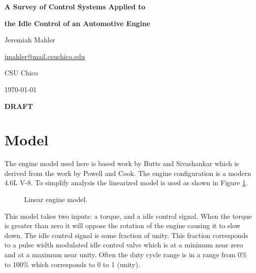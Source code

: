 \documentclass{article}
\begin{document}

\thispagestyle{empty}

\centerline{\Large \textbf{A Survey of Control Systems Applied to}}
\centerline{\Large \textbf{the Idle Control of an Automotive Engine}}
\vspace{0.1in}
\centerline{\normalsize {Jeremiah Mahler}}
\centerline{\small {\href{mailto:jmahler@mail.csuchico.edu}{jmahler@mail.csuchico.edu}} }
\vspace{0.1in}
\centerline{\normalsize {CSU Chico}}
\centerline{\small \today}
\vspace{0.2in}
\centerline{\LARGE \textbf{DRAFT}}
\vspace{0.2in}






\section{Model}

The engine model used here is based work
by Butts and Sivashankar\autocite{532315} which is derived from
the work by Powell and Cook\autocite{4789342}.
The engine configuration is a modern 4.6L V-8.
To simplify analysis the linearized model is used as shown in
Figure \ref{fig:lem}.

\xdistance{1.8cm}
\ydistance{2.0cm}

\begin{figure}[hbp!]
\begin{center}
\end{center}
\caption{Linear engine model.}\label{fig:lem}
\end{figure}

This model takes two inputs: a torque, and a idle control signal.
When the torque is greater than zero it will oppose the rotation of
the engine causing it to slow down.
The idle control signal is some fraction of unity.
This fraction corresponds to a pulse width modulated idle control valve
which is at a minimum near zero and at a maximum near unity.
Often the duty cycle range is in a range from 0\% to 100\% which
corresponds to 0 to 1 (unity).
\end{document}

